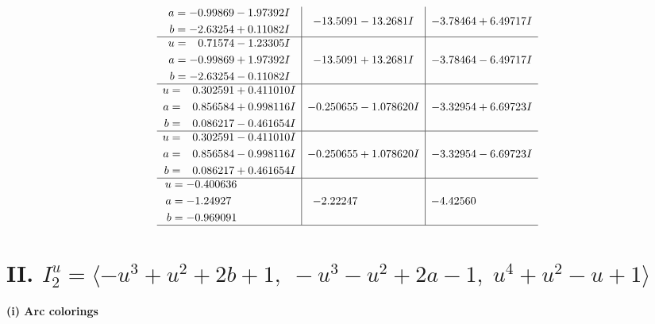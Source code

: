 \documentclass[1p]{elsarticle_modified}
\theoremstyle{definition}
\begin{document}
$$\begin{array}{c|c|c}
\begin{aligned}
a &= -0.99869 - 1.97392 I \\
b &= -2.63254 + 0.11082 I\end{aligned}
 & -13.5091 - 13.2681 I & -3.78464 + 6.49717 I \\ \hline\begin{aligned}
u &= \phantom{-}0.71574 - 1.23305 I \\
a &= -0.99869 + 1.97392 I \\
b &= -2.63254 - 0.11082 I\end{aligned}
 & -13.5091 + 13.2681 I & -3.78464 - 6.49717 I \\ \hline\begin{aligned}
u &= \phantom{-}0.302591 + 0.411010 I \\
a &= \phantom{-}0.856584 + 0.998116 I \\
b &= \phantom{-}0.086217 - 0.461654 I\end{aligned}
 & -0.250655 - 1.078620 I & -3.32954 + 6.69723 I \\ \hline\begin{aligned}
u &= \phantom{-}0.302591 - 0.411010 I \\
a &= \phantom{-}0.856584 - 0.998116 I \\
b &= \phantom{-}0.086217 + 0.461654 I\end{aligned}
 & -0.250655 + 1.078620 I & -3.32954 - 6.69723 I \\ \hline\begin{aligned}
u &= -0.400636\phantom{ +0.000000I} \\
a &= -1.24927\phantom{ +0.000000I} \\
b &= -0.969091\phantom{ +0.000000I}\end{aligned}
 & -2.22247\phantom{ +0.000000I} & -4.42560\phantom{ +0.000000I}\\
 \hline 
 \end{array}$$\newpage\newpage\renewcommand{\arraystretch}{1}
\centering \section*{II. $I^u_{2}= \langle - u^3+u^2+2 b+1,\;- u^3- u^2+2 a-1,\;u^4+u^2- u+1 \rangle$}
\flushleft \textbf{(i) Arc colorings}\\
\end{document}
